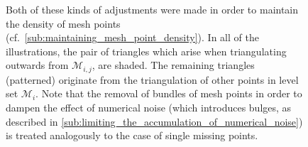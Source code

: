\begin{figure}[htpb]
{        Both of these kinds of adjustments were made in order to maintain the
        density of mesh points (cf.\
        \cref{sub:maintaining_mesh_point_density}). In all of the
        illustrations, the pair of triangles which arise when triangulating
        outwards from $\mathcal{M}_{i,j}$, are shaded. The remaining triangles
        (patterned) originate from the triangulation of other points in level
        set $\mathcal{M}_{i}$. Note that the removal of bundles of mesh points
        in order to dampen the effect of numerical noise (which introduces
        bulges, as described in
        \cref{sub:limiting_the_accumulation_of_numerical_noise}) is treated
        analogously to the case of single missing points.
    }
    \label{fig:triangulation_specialcases}
\end{figure}
